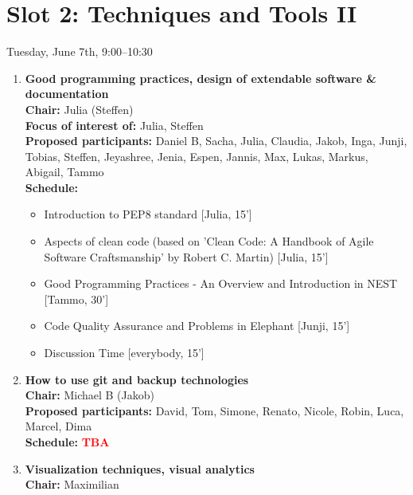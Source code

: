 \documentclass[10pt, a4paper,twoside,american]{article}
\newcommand{\alert}[1]{\textcolor{red}{\bf #1}}
\begin{document}
\section*{Slot 2: Techniques and Tools II}
Tuesday, June 7th, 9:00--10:30

\begin{enumerate}[resume]
\item {\large\bf Good programming practices, design of extendable software \& documentation}\\[1ex]
  {\bf Chair:} Julia (Steffen)\\[1ex]
  {\bf Focus of interest of:} Julia, Steffen\\[1ex]
  {\bf Proposed participants:} Daniel B, Sacha, Julia, Claudia, Jakob, Inga, Junji, Tobias, Steffen, Jeyashree, Jenia, Espen, Jannis, Max, Lukas, Markus, Abigail, Tammo\\[1ex]
  {\bf Schedule:}
  \begin{itemize}
  \item Introduction to PEP8 standard [Julia, 15']
  \item Aspects of clean code (based on 'Clean Code: A Handbook of Agile Software Craftsmanship' by Robert C. Martin) [Julia, 15']
  \item Good Programming Practices - An Overview and Introduction in NEST [Tammo, 30']
  \item Code Quality Assurance and Problems in Elephant [Junji, 15']
  \item Discussion Time [everybody, 15']
  \end{itemize}
\item {\large\bf How to use git and backup technologies}\\[1ex]
  {\bf Chair:} Michael B (Jakob)\\[1ex]
  {\bf Proposed participants:} David, Tom, Simone, Renato, Nicole, Robin, Luca, Marcel, Dima\\[1ex]
  {\bf Schedule:} \alert{TBA}
\item {\large\bf Visualization techniques, visual analytics}\\[1ex]
  {\bf Chair:} Maximilian \\[1ex]

\end{enumerate}
\end{document}
